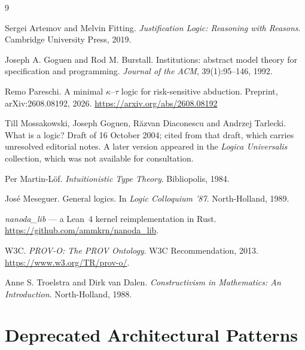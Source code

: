 \documentclass[manuscript,nonacm=true]{acmart}
\begin{document}
\begin{thebibliography}{9}

Sergei Artemov and Melvin Fitting.
\newblock \emph{Justification Logic: Reasoning with Reasons}.
\newblock Cambridge University Press, 2019.

Joseph A. Goguen and Rod M. Burstall.
\newblock Institutions: abstract model theory for specification and programming.
\newblock \emph{Journal of the ACM}, 39(1):95--146, 1992.

Remo Pareschi.
\newblock A minimal $\kappa$--$\tau$ logic for risk-sensitive abduction.
\newblock Preprint, arXiv:2608.08192, 2026. \url{https://arxiv.org/abs/2608.08192}

Till Mossakowski, Joseph Goguen, R\u{a}zvan Diaconescu and Andrzej Tarlecki.
\newblock What is a logic?
\newblock Draft of 16 October 2004; cited from that draft, which carries unresolved editorial
  notes. A later version appeared in the \emph{Logica Universalis} collection, which was not
  available for consultation.

Per Martin-L\"of.
\newblock \emph{Intuitionistic Type Theory}.
\newblock Bibliopolis, 1984.

Jos\'e Meseguer.
\newblock General logics.
\newblock In \emph{Logic Colloquium '87}. North-Holland, 1989.

\emph{nanoda\_lib} --- a Lean~4 kernel reimplementation in Rust.
\newblock \url{https://github.com/ammkrn/nanoda_lib}.

W3C.
\newblock \emph{PROV-O: The PROV Ontology}.
\newblock W3C Recommendation, 2013. \url{https://www.w3.org/TR/prov-o/}.

Anne S. Troelstra and Dirk van Dalen.
\newblock \emph{Constructivism in Mathematics: An Introduction}.
\newblock North-Holland, 1988.

\end{thebibliography}

\appendix

\section{Deprecated Architectural Patterns}
\label{sec:replaces}
\end{document}
